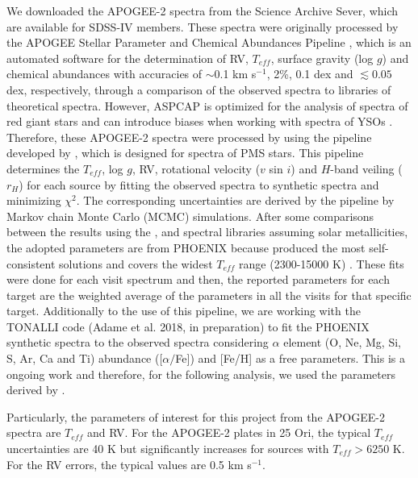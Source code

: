 \documentclass[12pt]{article}
\newcounter{subsubsubsection}[subsubsection]
\begin{document}
\label{sec_APOGEE-2:targets}
We downloaded the APOGEE-2 spectra from the Science Archive Sever, which are available for SDSS-IV members. These spectra were originally processed by the APOGEE Stellar Parameter and Chemical Abundances Pipeline \citep[ASPCAP; ][]{GarciaPerez2016}, which is an automated software for the determination of RV, $T_{eff}$, surface gravity (log $g$) and chemical abundances with accuracies of $\sim$0.1 km s$^{-1}$, 2\%, 0.1 dex and $\lesssim0.05$ dex, respectively, through a comparison of the observed spectra to libraries of theoretical spectra. However, ASPCAP is optimized for the analysis of spectra of red giant stars and can introduce biases when working with spectra of YSOs \citep{Nidever2015}. Therefore, these APOGEE-2 spectra were processed by \citet{Kounkel2018} using the pipeline developed by \citet{Cottaar2014}, which is designed for spectra of PMS stars. This pipeline determines the $T_{eff}$, log $g$, RV, rotational velocity ($v$ sin $i$) and $H$-band veiling ($r_H$) for each source by fitting the observed spectra to synthetic spectra and minimizing $\chi^2$. The corresponding uncertainties are derived by the pipeline by Markov chain Monte Carlo (MCMC) simulations. After some comparisons between the results using the \citet{Coelho2005}, \citet{Allard2012} and \citet[PHOENIX; ][]{Husser2013} spectral libraries assuming solar metallicities, the adopted parameters are from PHOENIX because produced the most self-consistent solutions and covers the widest $T_{eff}$ range (2300-15000 K) \citep{Kounkel2018}. These fits were done for each visit spectrum and then, the reported parameters for each target are the weighted average of the parameters in all the visits for that specific target. Additionally to the use of this pipeline, we are working with the TONALLI code (Adame et al. 2018, in preparation) to fit the PHOENIX synthetic spectra to the observed spectra considering $\alpha$ element (O, Ne, Mg, Si, S, Ar, Ca and Ti) abundance ([$\alpha/$Fe]) and [Fe/H] as a free parameters. This is a ongoing work and therefore, for the following analysis, we used the parameters derived by \citet{Kounkel2018}. 

Particularly, the parameters of interest for this project from the APOGEE-2 spectra are $T_{eff}$ and RV. For the APOGEE-2 plates in 25 Ori, the typical $T_{eff}$ uncertainties are 40 K but significantly increases for sources with $T_{eff}>6250$ K. For the RV errors, the typical values are 0.5 km s$^{-1}$.
\end{document}

